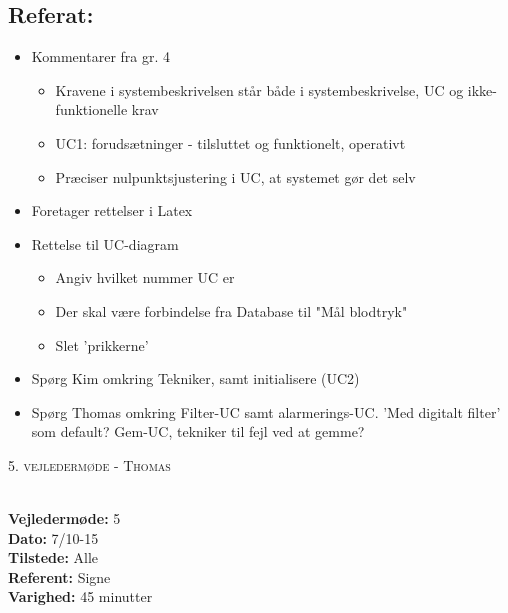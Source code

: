 \documentclass[a4paper,11pt,oneside]{memoir}
\begin{document}
\subsection{Referat:}
\begin{itemize}
\item Kommentarer fra gr. 4
\begin{itemize}
\item Kravene i systembeskrivelsen står både i systembeskrivelse, UC og ikke-funktionelle krav
\item UC1: forudsætninger - tilsluttet og funktionelt, operativt 
\item Præciser nulpunktsjustering i UC, at systemet gør det selv
\end{itemize}
\item Foretager rettelser i Latex
\item Rettelse til UC-diagram
\begin{itemize}
\item Angiv hvilket nummer UC er
\item Der skal være forbindelse fra Database til "Mål blodtryk"
\item Slet 'prikkerne'
\end{itemize}
\item Spørg Kim omkring Tekniker, samt initialisere (UC2)
\item Spørg Thomas omkring Filter-UC samt alarmerings-UC. 'Med digitalt filter' som default? Gem-UC, tekniker til fejl ved at gemme?
\end{itemize}

\newpage


\begin{center} 
\huge{\textsc{5. vejledermøde - Thomas}}
\end{center}

\textbf{ }
\\
\textbf{Vejledermøde:} 5
\\
\textbf{Dato:} 7/10-15
\\
\textbf{Tilstede:} Alle
\\
\textbf{Referent:} Signe
\\
\textbf{Varighed:} 45 minutter
\\
\end{document}
